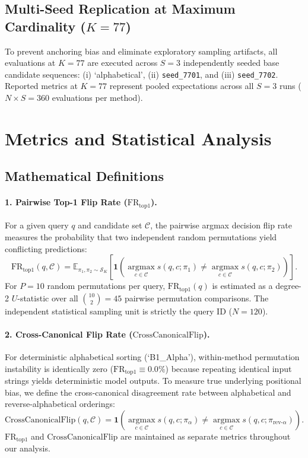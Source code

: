 \documentclass[10pt]{article}
\begin{document}
\subsection{Multi-Seed Replication at Maximum Cardinality (\texorpdfstring{$K=77$}{K=77})}
To prevent anchoring bias and eliminate exploratory sampling artifacts, all evaluations at $K=77$ are executed across $S=3$ independently seeded base candidate sequences: (i) `alphabetical', (ii) \texttt{seed\_7701}, and (iii) \texttt{seed\_7702}. Reported metrics at $K=77$ represent pooled expectations across all $S=3$ runs ($N \times S = 360$ evaluations per method).

\section{Metrics and Statistical Analysis}

\subsection{Mathematical Definitions}

\paragraph{1. Pairwise Top-1 Flip Rate ($\mathrm{FR}_{\mathrm{top1}}$).}
For a given query $q$ and candidate set $\mathcal{C}$, the pairwise argmax decision flip rate measures the probability that two independent random permutations yield conflicting predictions:
\begin{equation}
\mathrm{FR}_{\mathrm{top1}}(q, \mathcal{C}) = \mathbb{E}_{\pi_1, \pi_2 \sim \mathcal{S}_K} \left[ \mathbf{1}\left( \operatorname*{argmax}_{c \in \mathcal{C}} s(q, c; \pi_1) \neq \operatorname*{argmax}_{c \in \mathcal{C}} s(q, c; \pi_2) \right) \right].
\end{equation}
For $P=10$ random permutations per query, $\mathrm{FR}_{\mathrm{top1}}(q)$ is estimated as a degree-2 $U$-statistic over all $\binom{10}{2} = 45$ pairwise permutation comparisons. The independent statistical sampling unit is strictly the query ID ($N=120$).

\paragraph{2. Cross-Canonical Flip Rate ($\mathrm{CrossCanonicalFlip}$).}
For deterministic alphabetical sorting (`B1\_Alpha'), within-method permutation instability is identically zero ($\mathrm{FR}_{\mathrm{top1}} \equiv 0.0\%$) because repeating identical input strings yields deterministic model outputs. To measure true underlying positional bias, we define the cross-canonical disagreement rate between alphabetical and reverse-alphabetical orderings:
\begin{equation}
\mathrm{CrossCanonicalFlip}(q, \mathcal{C}) = \mathbf{1}\left( \operatorname*{argmax}_{c \in \mathcal{C}} s(q, c; \pi_{\alpha}) \neq \operatorname*{argmax}_{c \in \mathcal{C}} s(q, c; \pi_{\mathrm{rev}\text{-}\alpha}) \right).
\end{equation}
$\mathrm{FR}_{\mathrm{top1}}$ and $\mathrm{CrossCanonicalFlip}$ are maintained as separate metrics throughout our analysis.
\end{document}
